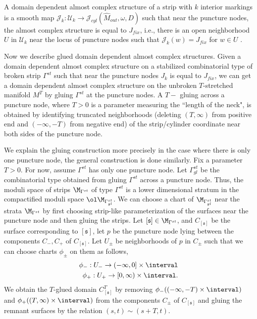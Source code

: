 \begin{defn}\label{def:domdepstruc}
A domain dependent almost complex structure of a strip with $k$ interior markings is a smooth map $\mathcal{J}_k: \mathcal{U}_k \to \mathcal{J}_{cyl}(\widehat M_{out},\omega,D)$ such that near the puncture nodes, the almost complex structure is equal to $J_{fix}$, i.e., there is an open neighborhood $U$ in $\mathcal{U}_k$ near the locus of puncture nodes such that  $\mathcal{J}_k (w) = J_{fix}$ for $w\in U$ . 
\end{defn}

Now we describe glued domain dependent almost complex structures. Given a domain dependent almost complex structure on a stabilized combinatorial type of broken strip $\Gamma^{st}$ such that near the puncture nodes $J_k$ is equal to $J_{fix}$, we can get a domain dependent almost complex structure on the unbroken  $T$-stretched manifold $M^T$ by gluing $\Gamma^{st}$ at the puncture nodes. A $T - $ gluing across a puncture node, where $T>0$ is a parameter measuring the ``length of the neck", is obtained by identifying truncated neighborhoods (deleting $(T,\infty)$ from positive end and $(-\infty,-T)$ from negative end) of the strip/cylinder coordinate near both sides of the puncture node.

We explain the gluing construction more precisely in the case where there is only one puncture node, the general construction is done similarly. Fix a parameter $T>0$. For now, assume $\Gamma^{st}$ has only one puncture node. Let $\Gamma^{st}_{gl}$ be the combinatorial type obtained from gluing $\Gamma^{st}$ across a puncture node. Thus, the moduli space of strips $\M_{\Gamma^{st}}$ of type $\Gamma^{st}$ is a lower dimensional stratum in the compactified moduli space $\ol \M_{\Gamma^{st}_{gl}}$. We can choose a chart of $\M_{\Gamma^{st}_{gl}}$ near the strata $\M_{\Gamma^{st}}$ by first choosing strip-like parameterization of the surfaces near the puncture node and then gluing the strips.  Let $[\mathfrak{s}]\in \M_{\Gamma^{st}}$, and $C_{[\mathfrak{s}]}$ be the surface corresponding to $[\mathfrak{s}]$, let $p$ be the puncture node lying between the components $C_-,C_+$ of $C_{[\mathfrak{s}]}$. Let $U_\pm$ be  neighborhoods of $p$ in $C_\pm$ such that we can choose charts  $\phi_\pm$ on them as follows,
\begin{align*}
    \phi_-:U_- \to (-\infty ,0] \times \interval \\
    \phi_+:U_+ \to [0,\infty) \times \interval.
\end{align*}
\noindent We obtain the $T$-glued domain $C^T_{[\mathfrak{s}]}$ by removing $\phi_-((-\infty,-T)\times \interval)$  and $\phi_+((T,\infty)\times \interval) $ from the components $C_\pm$ of $C_{[\mathfrak{s}]}$ and gluing the remnant surfaces by the relation $(s,t) \sim (s+T,t)$.

